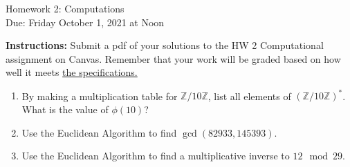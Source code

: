 \documentclass[10pt,a4paper]{article}
\newcommand{\Z}{\mathbb{Z}}
\begin{document}
\begin{center}
{\Large Homework 2: Computations}\\
Due: Friday October 1, 2021 at Noon\\


\end{center}
{\bf Instructions:} Submit a pdf of your solutions to the HW 2 Computational assignment on Canvas. Remember that your work will be graded based on how well it meets \href{https://docs.google.com/document/d/1emM06_WRh_h941rsjtRE9fRVndJtfRKd9gyS3Fs_rFA/edit?usp=sharing}{the specifications. }

\begin{enumerate}
\item By making a multiplication table for $\Z/10\Z$, list all elements of $(\Z/10\Z)^*$.  What is the value of $\phi(10)$?

 \item Use the Euclidean Algorithm to find $\gcd(82933, 145393)$.
\item Use the Euclidean Algorithm to find a multiplicative inverse to $12 \mod 29$. 

\end{enumerate}
\end{document}
